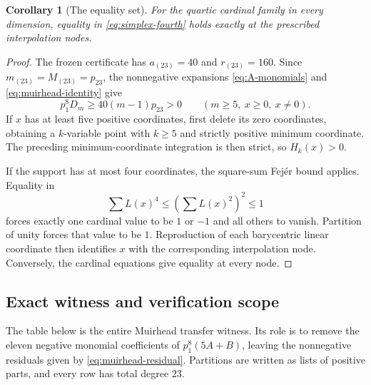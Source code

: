 \documentclass[11pt,a4paper]{article}
\newtheorem{corollary}[theorem]{Corollary}
\theoremstyle{definition}
\theoremstyle{remark}
\numberwithin{equation}{section}
\begin{document}
\begin{corollary}[The equality set]\label{cor:simplex-equality}
For the quartic cardinal family in every dimension, equality in
\eqref{eq:simplex-fourth} holds exactly at the prescribed interpolation nodes.
\end{corollary}
\begin{proof}
The frozen certificate has $a_{(23)}=40$ and $r_{(23)}=160$.
Since $m_{(23)}=M_{(23)}=p_{23}$, the nonnegative expansions
\eqref{eq:A-monomials} and \eqref{eq:muirhead-identity} give
\[
 p_1^8D_m\ge40(m-1)p_{23}>0
 \qquad(m\ge5,\ x\ge0,\ x\ne0).
\]
If $x$ has at least five positive coordinates, first delete its zero
coordinates, obtaining a $k$-variable point with $k\ge5$ and strictly
positive minimum coordinate. The preceding minimum-coordinate
integration is then strict, so $H_k(x)>0$.

If the support has at most four coordinates, the square-sum Fej\'er
bound applies. Equality in
\[
 \sum L(x)^4\le\left(\sum L(x)^2\right)^2\le1
\]
forces exactly one cardinal value to be $1$ or $-1$ and all others to
vanish. Partition of unity forces that value to be $1$.
Reproduction of each barycentric linear coordinate then identifies
$x$ with the corresponding interpolation node. Conversely, the
cardinal equations give equality at every node.
\end{proof}

\clearpage
\subsection{Exact witness and verification scope}

The table below is the entire Muirhead transfer witness.  Its role is
to remove the eleven negative monomial coefficients of
$p_1^8(5A+B)$, leaving the nonnegative residuals given by
\eqref{eq:muirhead-residual}.  Partitions are written as lists of
positive parts, and every row has total degree $23$.
\end{document}
